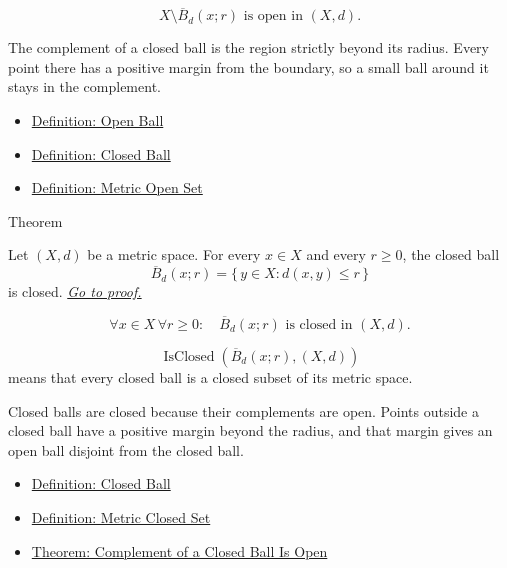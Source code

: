 \begin{remark*}
\[
X\setminus \overline{B}_d(x;r)
\text{ is open in }(X,d).
\]
\end{remark*}

\begin{remark*}[Interpretation]
The complement of a closed ball is the region strictly beyond its radius.
Every point there has a positive margin from the boundary, so a small ball
around it stays in the complement.
\end{remark*}

\begin{dependencies}
\begin{itemize}
  \item \hyperref[def:metric-open-ball]{Definition: Open Ball}
  \item \hyperref[def:metric-closed-ball]{Definition: Closed Ball}
  \item \hyperref[def:metric-open-set]{Definition: Metric Open Set}
\end{itemize}
\end{dependencies}

\begin{theorembox}{Theorem}
\begin{theorem}\label{thm:metric-closed-balls-are-closed}
Let \((X,d)\) be a metric space.  For every \(x\in X\) and every \(r\geq 0\),
the closed ball
\[
  \overline{B}_d(x;r)=\{\,y\in X:d(x,y)\leq r\,\}
\]
is closed.
\hyperref[prf:metric-closed-balls-are-closed]{\textit{Go to proof.}}
\end{theorem}
\end{theorembox}

\begin{remark*}
\[
\forall x\in X\,\forall r\geq 0{:}\quad
\overline{B}_d(x;r)\text{ is closed in }(X,d).
\]
\end{remark*}

\begin{remark*}
\[
\operatorname{IsClosed}(\overline{B}_d(x;r),(X,d))
\]
means that every closed ball is a closed subset of its metric space.
\end{remark*}

\begin{remark*}[Interpretation]
Closed balls are closed because their complements are open.  Points outside a
closed ball have a positive margin beyond the radius, and that margin gives an
open ball disjoint from the closed ball.
\end{remark*}

\begin{dependencies}
\begin{itemize}
  \item \hyperref[def:metric-closed-ball]{Definition: Closed Ball}
  \item \hyperref[def:metric-closed-set]{Definition: Metric Closed Set}
  \item \hyperref[thm:metric-complement-closed-ball-open]{Theorem: Complement of a Closed Ball Is Open}
\end{itemize}
\end{dependencies}
